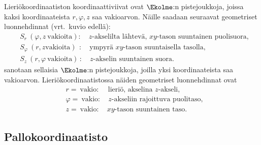 Lieriökoordinaatiston koordinaattiviivat ovat $\Ekolme$:n pistejoukkoja, joissa kaksi 
koordinaateista $r,\varphi,z$ saa vakioarvon. Näille saadaan seuraavat geometriset luonnehdinnat
(vrt.\ kuvio edellä):
\begin{align*}
&S_r\       (\varphi,z\ \text{vakioita}): \quad \text{$z$-akselilta lähtevä, 
                                                      $xy$-tason suuntainen puolisuora}, \\
&S_\varphi\ (r,z \text{vakioita})\,\ :  \quad \text{ympyrä $xy$-tason suuntaisella tasolla}, \\
&S_z\       (r,\varphi\ \text{vakioita})\, : \quad \text{$z$-akselin suuntainen suora}.
\end{align*}
%
 sanotaan sellaisia $\Ekolme$:n pistejoukkoja, joilla yksi
koordinaateista saa vakioarvon. Lieriökoordinaatistossa näiden geometriset luonnehdinnat ovat
\begin{align*}
&r=\ \text{vakio}:       \quad\, \text{lieriö, akselina $z$-akseli}, \\
&\varphi=\ \text{vakio}: \quad   \text{$z$-akseliin rajoittuva puolitaso}, \\
&z=\ \text{vakio}:       \quad   \text{$xy$-tason suuntainen taso}.
\end{align*}

\subsection{Pallokoordinaatisto}


